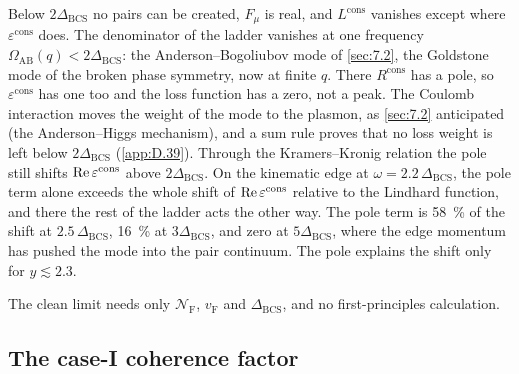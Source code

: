 Below $2\Delta_{\mathrm{BCS}}$ no pairs can be created, $F_\mu$ is real, and $L^{\mathrm{cons}}$ vanishes except where $\varepsilon^{\mathrm{cons}}$ does. The denominator of the ladder vanishes at one frequency $\varOmega_{\mathrm{AB}}(q) < 2\Delta_{\mathrm{BCS}}$: the Anderson--Bogoliubov mode of \cref{sec:7.2}, the Goldstone mode of the broken phase symmetry, now at finite $q$. There $R^{\mathrm{cons}}$ has a pole, so $\varepsilon^{\mathrm{cons}}$ has one too and the loss function has a zero, not a peak. The Coulomb interaction moves the weight of the mode to the plasmon, as \cref{sec:7.2} anticipated (the Anderson--Higgs mechanism), and a sum rule proves that no loss weight is left below $2\Delta_{\mathrm{BCS}}$ (\cref{app:D.39}). Through the Kramers--Kronig relation the pole still shifts $\operatorname{Re}\varepsilon^{\mathrm{cons}}$ above $2\Delta_{\mathrm{BCS}}$. On the kinematic edge at $\omega = 2.2\,\Delta_{\mathrm{BCS}}$, the pole term alone exceeds the whole shift of $\operatorname{Re}\varepsilon^{\mathrm{cons}}$ relative to the Lindhard function, and there the rest of the ladder acts the other way. The pole term is \SI{58}{\percent} of the shift at $2.5\,\Delta_{\mathrm{BCS}}$, \SI{16}{\percent} at $3\Delta_{\mathrm{BCS}}$, and zero at $5\Delta_{\mathrm{BCS}}$, where the edge momentum has pushed the mode into the pair continuum. The pole explains the shift only for $y \lesssim 2.3$.

The clean limit needs only $\mathcal{N}_{\mathrm{F}}$, $v_{\mathrm{F}}$ and $\Delta_{\mathrm{BCS}}$, and no first-principles calculation.

\subsection{The case-I coherence factor}\label{sec:15.1-bare}


